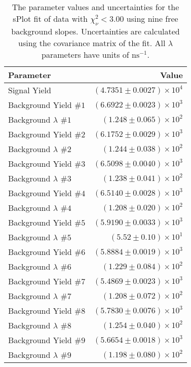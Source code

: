 
\begin{table}[ht]
    \begin{center}
        \begin{tabular}{lr}\toprule
            Parameter & Value \\\midrule
            Signal Yield & $(4.7351 \pm 0.0027) \times 10^{4}$ \\
            Background Yield $\#1$ & $(6.6922 \pm 0.0023) \times 10^{3}$ \\
            Background $\lambda$ $\#1$ & $(1.248 \pm 0.065) \times 10^{2}$ \\
            Background Yield $\#2$ & $(6.1752 \pm 0.0029) \times 10^{3}$ \\
            Background $\lambda$ $\#2$ & $(1.244 \pm 0.038) \times 10^{2}$ \\
            Background Yield $\#3$ & $(6.5098 \pm 0.0040) \times 10^{3}$ \\
            Background $\lambda$ $\#3$ & $(1.238 \pm 0.041) \times 10^{2}$ \\
            Background Yield $\#4$ & $(6.5140 \pm 0.0028) \times 10^{3}$ \\
            Background $\lambda$ $\#4$ & $(1.208 \pm 0.020) \times 10^{2}$ \\
            Background Yield $\#5$ & $(5.9190 \pm 0.0033) \times 10^{3}$ \\
            Background $\lambda$ $\#5$ & $(5.52 \pm 0.10) \times 10^{1}$ \\
            Background Yield $\#6$ & $(5.8884 \pm 0.0019) \times 10^{3}$ \\
            Background $\lambda$ $\#6$ & $(1.229 \pm 0.084) \times 10^{2}$ \\
            Background Yield $\#7$ & $(5.4869 \pm 0.0023) \times 10^{3}$ \\
            Background $\lambda$ $\#7$ & $(1.208 \pm 0.072) \times 10^{2}$ \\
            Background Yield $\#8$ & $(5.7830 \pm 0.0076) \times 10^{3}$ \\
            Background $\lambda$ $\#8$ & $(1.254 \pm 0.040) \times 10^{2}$ \\
            Background Yield $\#9$ & $(5.6654 \pm 0.0018) \times 10^{3}$ \\
            Background $\lambda$ $\#9$ & $(1.198 \pm 0.080) \times 10^{2}$ \\\bottomrule
        \end{tabular}
        \caption{The parameter values and uncertainties for the sPlot fit of data with $\chi^2_\nu < 3.00$ using nine free background slopes. Uncertainties are calculated using the covariance matrix of the fit. All $\lambda$ parameters have units of $\si{\nano\second}^{-1}$.}\label{tab:splot-fit-results-chisqdof-3.00-free-9}
    \end{center}
\end{table}
